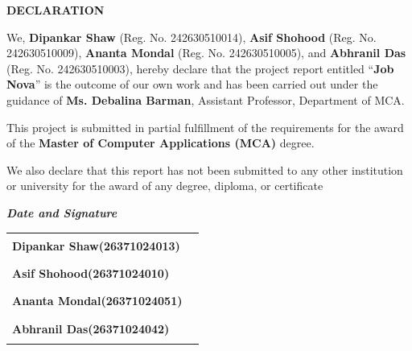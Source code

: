 \documentclass[12pt,a4paper]{report}
\begin{document}
\newpage


\begin{center}
            \centering
            \vspace{3cm}

            {\Huge \textbf{\textcolor{primaryblue}{DECLARATION}}}

            \vspace{2.5cm}

            \parbox{0.95\textwidth}{
                \onehalfspacing
                \large
                We, \textbf{Dipankar Shaw} (Reg. No. 242630510014), \textbf{Asif Shohood} (Reg. No. 242630510009), \textbf{Ananta Mondal} (Reg. No. 242630510005), and \textbf{Abhranil Das} (Reg. No. 242630510003), hereby declare that the project report entitled ``\textbf{Job Nova}'' is the outcome of our own work and has been carried out under the guidance of \textbf{Ms. Debalina Barman}, Assistant Professor, Department of MCA.

                \vspace{1em}

                This project is submitted in partial fulfillment of the requirements for the award of the \textbf{Master of Computer Applications (MCA)} degree.

                \vspace{1em}
                
                We also declare that this report has not been submitted to any other institution or university for the award of any degree, diploma, or certificate
            }

            \vspace{2cm}

            \begin{flushright}
                \large \textbf{\textit{Date and Signature}}\hspace{1cm}
            \end{flushright}
            
            \vspace{0.5cm}

            \noindent
            \begin{tabular}{p{} p{}}
                \textbf{\large Dipankar Shaw(26371024013)} & \rule{7cm}{0.5pt} \\[1.5cm]
                \textbf{\large Asif Shohood(26371024010)} & \rule{7cm}{0.5pt} \\[1.5cm]
                \textbf{\large Ananta Mondal(26371024051)} & \rule{7cm}{0.5pt} \\[1.5cm]
                \textbf{\large Abhranil Das(26371024042)} & \rule{7cm}{0.5pt} \\
            \end{tabular}


\end{center}
\end{document}
